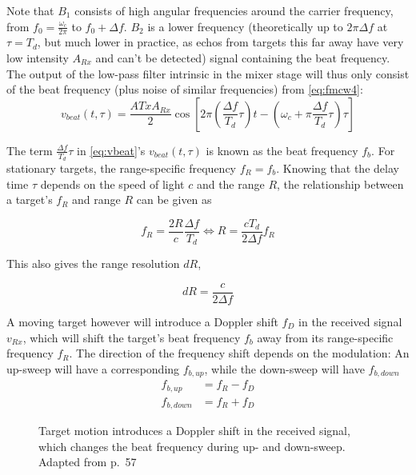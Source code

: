 Note that \(B_1\) consists of high angular frequencies around the
carrier frequency, from \(f_0 = \frac{\omega_c}{2\pi}\) to
\(f_0 + \Delta f\). \(B_2\) is a lower frequency (theoretically up to
\(2\pi\Delta f\) at \(\tau = T_d\), but much lower in practice, as echos
from targets this far away have very low intensity \(A_{Rx}\) and can't
be detected) signal containing the beat frequency. The output of the
low-pass filter intrinsic in the mixer stage will thus only consist of
the beat frequency (plus noise of similar frequencies) from \cref{eq:fmcw4}:
\begin{equation} \label{eq:vbeat}
    v_{beat}(t,\tau) = \frac{A{Tx}A_{Rx}}{2} \cos \left[ 2\pi\left(\frac{\Delta f}{T_d}\tau\right)t - \left(\omega_c + \pi\frac{\Delta f}{T_d}\tau \right) \tau \right]
\end{equation}

The term \(\frac{\Delta f}{T_d}\tau\) in \cref{eq:vbeat}'s \(v_{beat}(t,\tau)\) is
known as the beat frequency \(f_b\). For stationary targets, the
range-specific frequency \(f_R = f_b\). Knowing that the delay time
\(\tau\) depends on the speed of light \(c\) and the range \(R\), the
relationship between a target's \(f_R\) and range \(R\) can be given as

\begin{equation}\label{eq:range}
	f_R = \frac{2R}{c} \frac{\Delta f}{T_d} \iff R=\frac{c T_d}{2\Delta f}f_R
\end{equation}

This also gives the range resolution \(dR\),

\begin{equation}
	dR = \frac{c}{2 \Delta f}
\end{equation}

A moving target however will introduce a Doppler shift \(f_D\) in the
received signal \(v_{Rx}\), which will shift the target's beat frequency
\(f_b\) away from its range-specific frequency \(f_R\). The direction of
the frequency shift depends on the modulation: An up-sweep will have a
corresponding $f_{b,up}$, while the down-sweep will have $f_{b,down}$
\begin{align}
	f_{b,up}    &= f_R - f_D \label{eq:vbeatup} \\
	f_{b,down}  &= f_R + f_D \label{eq:vbeatdn}
\end{align}

\begin{figure}[htbp]
    \centering
    \def\svgwidth{10cm}
    
    \caption{\label{fig:fmcw_doppler}Target motion introduces a Doppler shift in the received signal, which changes the beat frequency during up- and down-sweep. Adapted from \cite{Adams2012} p.~57}
\end{figure}

